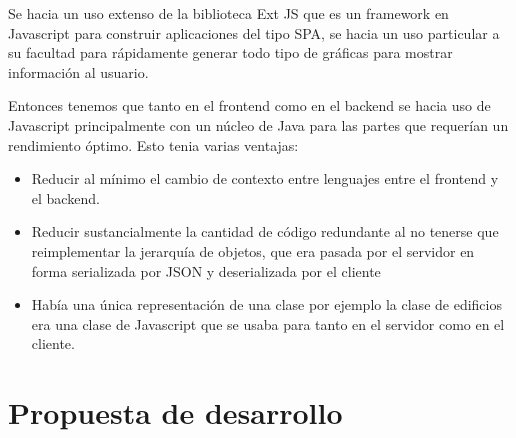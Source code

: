 Se hacia un uso extenso de la biblioteca Ext JS que es un framework
en Javascript para construir aplicaciones del tipo SPA, se hacia un uso particular
a su facultad para rápidamente generar todo tipo de gráficas para mostrar
información al usuario.

Entonces tenemos que tanto en el frontend como en el backend se hacia
uso de Javascript principalmente con un núcleo de Java para las partes
que requerían un rendimiento óptimo. Esto tenia varias ventajas:

\begin{itemize}
\item Reducir al mínimo el cambio de contexto entre lenguajes entre
  el frontend y el backend.
\item Reducir sustancialmente la cantidad de código redundante al no
  tenerse que reimplementar la jerarquía de objetos, que era pasada
  por el servidor en forma serializada por JSON y deserializada por el
  cliente
\item Había una única representación de una clase por ejemplo la
  clase de edificios era una clase de Javascript que se usaba para
  tanto en el servidor como en el cliente.
\end{itemize}

\section{Propuesta de desarrollo}
